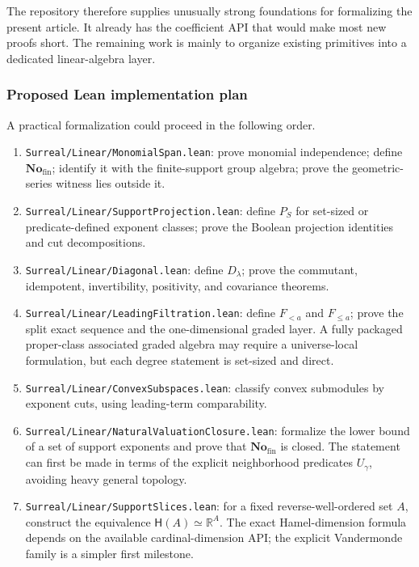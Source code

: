 \documentclass[11pt,letterpaper]{article}
\numberwithin{equation}{section}
\theoremstyle{definition}
\theoremstyle{remark}
\newcommand{\No}{\mathbf{No}}
\newcommand{\R}{\mathbb{R}}
\newcommand{\Hahn}{\mathsf{H}}
\newcommand{\Fin}{\No_{\mathrm{fin}}}
\newcommand{\pathcode}[1]{\nolinkurl{#1}}
\begin{document}
The repository therefore supplies unusually strong foundations for formalizing the
present article. It already has the coefficient API that would make most new proofs
short. The remaining work is mainly to organize existing primitives into a dedicated
linear-algebra layer.

\subsubsection{Proposed Lean implementation plan}

A practical formalization could proceed in the following order.

\begin{enumerate}[label=\textbf{L\arabic*.},leftmargin=2.8em]
\item \pathcode{Surreal/Linear/MonomialSpan.lean}: prove monomial independence;
define $\Fin$; identify it with the finite-support group algebra; prove the
geometric-series witness lies outside it.

\item \pathcode{Surreal/Linear/SupportProjection.lean}: define $P_S$ for set-sized
or predicate-defined exponent classes; prove the Boolean projection identities and
cut decompositions.

\item \pathcode{Surreal/Linear/Diagonal.lean}: define $D_\lambda$; prove the
commutant, idempotent, invertibility, positivity, and covariance theorems.

\item \pathcode{Surreal/Linear/LeadingFiltration.lean}: define $F_{<a}$ and
$F_{\le a}$; prove the split exact sequence and the one-dimensional graded layer.
A fully packaged proper-class associated graded algebra may require a universe-local
formulation, but each degree statement is set-sized and direct.

\item \pathcode{Surreal/Linear/ConvexSubspaces.lean}: classify convex submodules
by exponent cuts, using leading-term comparability.

\item \pathcode{Surreal/Linear/NaturalValuationClosure.lean}: formalize the lower
bound of a set of support exponents and prove that $\Fin$ is closed. The statement
can first be made in terms of the explicit neighborhood predicates $U_\gamma$,
avoiding heavy general topology.

\item \pathcode{Surreal/Linear/SupportSlices.lean}: for a fixed reverse-well-ordered
set $A$, construct the equivalence $\Hahn(A)\simeq\R^A$. The exact Hamel-dimension
formula depends on the available cardinal-dimension API; the explicit Vandermonde
family is a simpler first milestone.
\end{enumerate}
\end{document}
